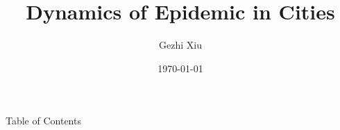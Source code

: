 \documentclass{beamer}
\title{Dynamics of Epidemic in Cities}
\author{Gezhi Xiu}
\date{\today}
\institute{IRSGIS\\Peking U}
\begin{document}
    
\maketitle

\begin{frame}{Table of Contents}
    \tableofcontents    
\end{frame}





\end{document}
